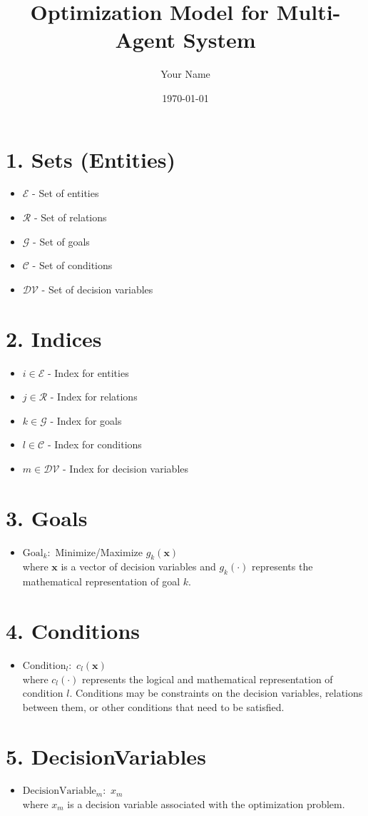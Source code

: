\documentclass{article}
\begin{document}
\title{Optimization Model for Multi-Agent System}
\author{Your Name}
\date{\today}
\maketitle
\tableofcontents

\section{1. Sets (Entities)}
\begin{itemize}
    \item $\mathcal{E}$ - Set of entities
    \item $\mathcal{R}$ - Set of relations
    \item $\mathcal{G}$ - Set of goals
    \item $\mathcal{C}$ - Set of conditions
    \item $\mathcal{DV}$ - Set of decision variables
\end{itemize}

\section{2. Indices}
\begin{itemize}
    \item $i \in \mathcal{E}$ - Index for entities
    \item $j \in \mathcal{R}$ - Index for relations
    \item $k \in \mathcal{G}$ - Index for goals
    \item $l \in \mathcal{C}$ - Index for conditions
    \item $m \in \mathcal{DV}$ - Index for decision variables
\end{itemize}

\section{3. Goals}
\begin{itemize}
    \item $\text{Goal}_k:$ Minimize/Maximize $g_k(\mathbf{x})$ \\
    where $\mathbf{x}$ is a vector of decision variables and $g_k(\cdot)$ represents the mathematical representation of goal $k$.
\end{itemize}

\section{4. Conditions}
\begin{itemize}
    \item $\text{Condition}_l:$ $c_l(\mathbf{x})$ \\
    where $c_l(\cdot)$ represents the logical and mathematical representation of condition $l$. Conditions may be constraints on the decision variables, relations between them, or other conditions that need to be satisfied.
\end{itemize}

\section{5. DecisionVariables}
\begin{itemize}
    \item $\text{DecisionVariable}_m:$ $x_m$ \\
    where $x_m$ is a decision variable associated with the optimization problem.
\end{itemize}
\end{document}
